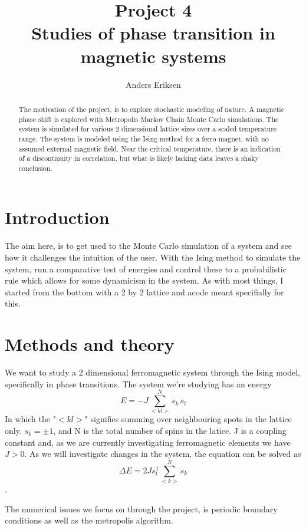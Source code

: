 \documentclass[10pt, twocolumn]{revtex4-1}
\begin{document}
\title{%
    Project 4\\
    \large Studies of phase transition in magnetic systems}
\author{Anders Eriksen}
\begin{abstract}
    The motivation of the project, is to explore stochastic modeling of nature.
    A magnetic phase shift is explored with Metropolis Markov Chain Monte Carlo simulations. The system is simulated for various $2$ dimensional lattice
    sizes over a scaled temperature range. The system is modeled using the Ising method for a ferro magnet, with no assumed external magnetic field.
    Near the critical temperature, there is an indication of a discontinuity in correlation, but what is likely lacking data leaves a shaky conclusion.
\end{abstract}
\maketitle

\section{Introduction}
The aim here, is to get used to the Monte Carlo simulation of a system and see how it challenges the intuition of the user. With the Ising method to
simulate the system, run a comparative test of energies and control these to a probabilistic rule which allows for some dynamicism in the system. As
with most things, I started from the bottom with a 2 by 2 lattice and acode meant specifially for this. \cite{MortenIsingmodel}


\section{Methods and theory}

We want to study a 2 dimensional ferromagnetic system through the Ising model, specifically in phase transitions.
The system we're studying has an energy
\[ E = -J \sum_{<kl>}^N s_k \, s_l \]
In which the "$<kl>$" signifies summing over neighbouring spots in the lattice only. $s_k = \pm 1$, and N is the total number of spins in
the latice. J is a coupling constant and, as we are currently investigating ferromagnetic elements we have $J > 0$.
As we will investigate changes in the system, the equation can be solved as
\[ \Delta E = 2 Js_l^1 \sum_{<k>}^N s_k \].

The numerical issues we focus on through the project, is periodic boundary conditions as well as the metropolis algorithm. %
\end{document}
